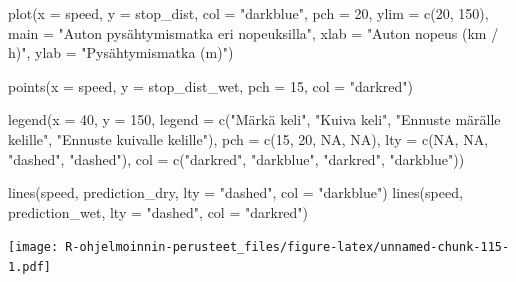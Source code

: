 \documentclass[
]{book}
\newenvironment{Shaded}{\begin{snugshade}}{\end{snugshade}}
\newcommand{\AttributeTok}[1]{\textcolor[rgb]{0.77,0.63,0.00}{#1}}
\newcommand{\ConstantTok}[1]{\textcolor[rgb]{0.00,0.00,0.00}{#1}}
\newcommand{\DecValTok}[1]{\textcolor[rgb]{0.00,0.00,0.81}{#1}}
\newcommand{\FunctionTok}[1]{\textcolor[rgb]{0.00,0.00,0.00}{#1}}
\newcommand{\NormalTok}[1]{#1}
\newcommand{\StringTok}[1]{\textcolor[rgb]{0.31,0.60,0.02}{#1}}
\begin{document}
\begin{Shaded}
\begin{Highlighting}[]
\FunctionTok{plot}\NormalTok{(}\AttributeTok{x =}\NormalTok{ speed, }\AttributeTok{y =}\NormalTok{ stop\_dist,}
     \AttributeTok{col =} \StringTok{"darkblue"}\NormalTok{, }\AttributeTok{pch =} \DecValTok{20}\NormalTok{,}
     \AttributeTok{ylim =} \FunctionTok{c}\NormalTok{(}\DecValTok{20}\NormalTok{, }\DecValTok{150}\NormalTok{),}
     \AttributeTok{main =} \StringTok{"Auton pysähtymismatka eri nopeuksilla"}\NormalTok{,}
     \AttributeTok{xlab =} \StringTok{"Auton nopeus (km / h)"}\NormalTok{, }\AttributeTok{ylab =} \StringTok{"Pysähtymismatka (m)"}\NormalTok{)}

\FunctionTok{points}\NormalTok{(}\AttributeTok{x =}\NormalTok{ speed, }\AttributeTok{y =}\NormalTok{ stop\_dist\_wet, }\AttributeTok{pch =} \DecValTok{15}\NormalTok{, }\AttributeTok{col =} \StringTok{"darkred"}\NormalTok{)}

\FunctionTok{legend}\NormalTok{(}\AttributeTok{x =} \DecValTok{40}\NormalTok{, }\AttributeTok{y =} \DecValTok{150}\NormalTok{,}
       \AttributeTok{legend =} \FunctionTok{c}\NormalTok{(}\StringTok{"Märkä keli"}\NormalTok{, }\StringTok{"Kuiva keli"}\NormalTok{,}
                  \StringTok{"Ennuste märälle kelille"}\NormalTok{,}
                  \StringTok{"Ennuste kuivalle kelille"}\NormalTok{),}
       \AttributeTok{pch =} \FunctionTok{c}\NormalTok{(}\DecValTok{15}\NormalTok{, }\DecValTok{20}\NormalTok{, }\ConstantTok{NA}\NormalTok{, }\ConstantTok{NA}\NormalTok{),}
       \AttributeTok{lty =} \FunctionTok{c}\NormalTok{(}\ConstantTok{NA}\NormalTok{, }\ConstantTok{NA}\NormalTok{, }\StringTok{"dashed"}\NormalTok{, }\StringTok{"dashed"}\NormalTok{),}
       \AttributeTok{col =} \FunctionTok{c}\NormalTok{(}\StringTok{"darkred"}\NormalTok{, }\StringTok{"darkblue"}\NormalTok{, }\StringTok{"darkred"}\NormalTok{, }\StringTok{"darkblue"}\NormalTok{))}

\FunctionTok{lines}\NormalTok{(speed, prediction\_dry, }\AttributeTok{lty =} \StringTok{"dashed"}\NormalTok{, }\AttributeTok{col =} \StringTok{"darkblue"}\NormalTok{)}
\FunctionTok{lines}\NormalTok{(speed, prediction\_wet, }\AttributeTok{lty =} \StringTok{"dashed"}\NormalTok{, }\AttributeTok{col =} \StringTok{"darkred"}\NormalTok{)}
\end{Highlighting}
\end{Shaded}

\texttt{[image: R-ohjelmoinnin-perusteet\_files/figure-latex/unnamed-chunk-115-1.pdf]}
\end{document}
